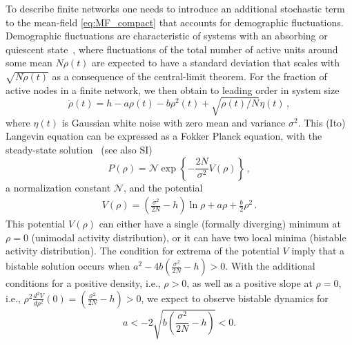 To describe finite networks one needs to introduce an additional stochastic term to the mean-field \cref{eq:MF_compact} that accounts for demographic fluctuations.
Demographic fluctuations are characteristic of systems with an absorbing or quiescent state~\cite{henkel_absorbing_2008}, where fluctuations of the total number of active units around some mean $N\rho(t)$ are expected to have a standard deviation that scales with $\sqrt{N\rho(t)}$ as a consequence of the central-limit theorem.
For the fraction of active nodes in a finite network, we then obtain to leading order in system size
\begin{equation}\label{eq:MF_noise}
    \dot{\rho}(t) = h - a\rho(t) -b\rho^2(t) + \sqrt{\rho(t)/N}\eta(t)\, ,
\end{equation}
where $\eta(t)$ is Gaussian white noise with zero mean and variance $\sigma^2$.
This (Ito) Langevin equation can be expressed as a Fokker Planck equation, with the steady-state solution~\cite{munoz_nature_1998} (see also SI)
\begin{equation}
    P(\rho) = \mathcal{N}\exp\left\{-\frac{2N}{\sigma^2}V(\rho)\right\}\, ,
\end{equation}
a normalization constant $\mathcal{N}$, and the potential
\begin{align}\label{eq:potential}
    V(\rho) = \left(\frac{\sigma^2}{2N} - h\right)\ln\rho + a\rho + \frac{b}{2}\rho^2\, .
\end{align}
This potential $V(\rho)$ can either have a single (formally diverging) minimum at $\rho=0$ (unimodal activity distribution), or it can have two local minima (bistable activity distribution).
The condition for extrema of the potential $V$ imply that a bistable solution occurs when
    $a^2-4b(\frac{\sigma^2}{2N}-h)>0$.
With the additional conditions for a positive density, i.e., $\rho>0$, as well as a positive slope at $\rho=0$, i.e., $\rho^2\frac{d^2V}{d\rho^2}(0)=(\frac{\sigma^2}{2N}-h)>0$, we expect to observe bistable dynamics for
\begin{equation}\label{eq:condition-bistable}
    a<-2\sqrt{b\left(\frac{\sigma^2}{2N}-h\right)}<0.
\end{equation}

